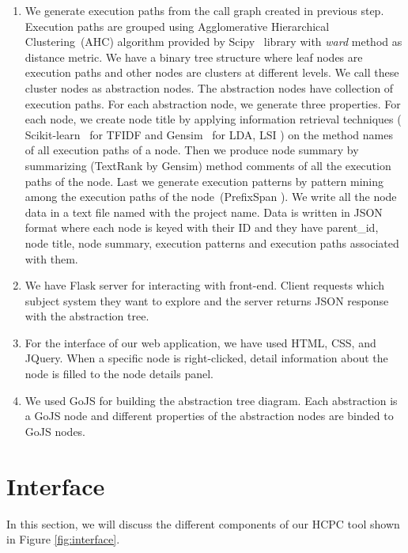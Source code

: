 \begin{enumerate}
    \item We generate execution paths from the call graph created in previous step.
Execution paths are grouped using Agglomerative Hierarchical Clustering~(AHC) algorithm provided by Scipy~\cite{scipy} library with \emph{ward} method as distance metric. We have a binary tree structure where leaf nodes are execution paths and other nodes are clusters at different levels. We call these cluster nodes as abstraction nodes. The abstraction nodes have collection of execution paths. For each abstraction node, we generate three properties. For each node, we create node title by applying information retrieval techniques ( Scikit-learn~\cite{scikit-learn} for TFIDF and Gensim~\cite{gensim} for LDA, LSI ) on the method names of all execution paths of a node. Then we produce node summary by summarizing (TextRank by Gensim) method comments of all the execution paths of the node. Last we generate execution patterns by pattern mining among the execution paths of the node~(PrefixSpan \cite{prefixspan}). We write all the node data in a text file named with the project name. Data is written in JSON format where each node is keyed with their ID and they have parent\_id, node title, node summary, execution patterns and execution paths associated with them. 
    \item We have Flask server for interacting with front-end. Client requests which subject system they want to explore and the server returns JSON response with the abstraction tree. 
    \item For the interface of our web application, we have used HTML, CSS, and JQuery. When a specific node is right-clicked, detail information about the node is filled to the node details panel.
    \item We used GoJS for building the abstraction tree diagram. Each abstraction  is a GoJS node and different properties of the abstraction nodes are binded to GoJS nodes. 

\end{enumerate}


\section{Interface}
\label{hla3:interface}
In this section, we will discuss the different components of our HCPC tool shown in Figure \ref{fig:interface}.

